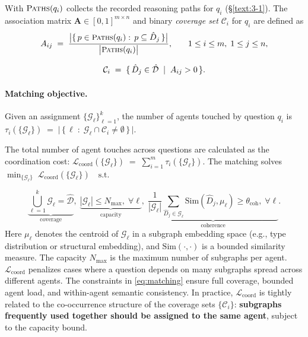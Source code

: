 \documentclass[sigconf]{acmart}
\begin{document}
With \(\textsc{Paths}(q_i)\) collects the recorded reasoning paths for \(q_i\) (\S\ref{text:3-1}). The association matrix \(\mathbf{A}\in[0,1]^{m\times n}\) and binary \emph{coverage set} \(\mathcal{C}_i\) for \(q_i\) are defined as
\begin{equation}
\small
A_{ij}
\;=\;
\frac{\bigl|\{\,p \in \textsc{Paths}(q_i):\, p \subseteq \hat{D}_j\,\}\bigr|}
{\bigl|\textsc{Paths}(q_i)\bigr|},
\qquad
1\le i\le m,\; 1\le j\le n,
\label{eq:assoc}
\end{equation}

\begin{equation}
\small
\mathcal{C}_i \;=\; \{\, \hat{D}_j \in \hat{\mathcal{D}} \; \mid \; A_{ij}>0 \,\}.
\label{eq:coverage}
\end{equation}


\paragraph{Matching objective.}
Given an assignment \(\{\mathcal{G}_\ell\}_{\ell=1}^k\), the number of agents
touched by question \(q_i\) is
$
\tau_i(\{\mathcal{G}_\ell\})
\;=\;
\bigl|\, \{\, \ell \;:\; \mathcal{G}_\ell \cap \mathcal{C}_i \neq \emptyset \,\} \,\bigr|.
$

The total number of agent touches across questions are calculated as the coordination cost:
$
\mathcal{L}_{\text{coord}}(\{\mathcal{G}_\ell\})
\;=\;
\sum_{i=1}^{m} \tau_i(\{\mathcal{G}_\ell\}).
$ The matching solves
$
\min_{\{\mathcal{G}_\ell\}}
\;\mathcal{L}_{\text{coord}}(\{\mathcal{G}_\ell\})
\quad
\text{s.t.}
$

\begin{equation}
\underbrace{\bigcup_{\ell=1}^{k}\mathcal{G}_\ell=\hat{\mathcal{D}}}_{\text{coverage}},
\;
\underbrace{|\mathcal{G}_\ell|\le N_{\max},\;\forall\ell}_{\text{capacity}},
\;
\underbrace{\frac{1}{|\mathcal{G}_\ell|}\!\sum_{\hat{D}_j\in\mathcal{G}_\ell}
\text{Sim}(\hat{D}_j,\mu_\ell)\ge \theta_{\text{coh}},\;\forall\ell}_{\text{coherence}}.
\label{eq:matching}
\end{equation}
Here \(\mu_\ell\) denotes the centroid of \(\mathcal{G}_\ell\) in a subgraph embedding
space (e.g., type distribution or structural embedding), and
\(\text{Sim}(\cdot,\cdot)\) is a bounded similarity measure.
The capacity \(N_{\max}\) is the maximum number of subgraphs per agent. \(\mathcal{L}_{\text{coord}}\) penalizes cases where a question depends on many subgraphs spread across different agents. The constraints in \eqref{eq:matching} ensure full coverage, bounded agent load,
and within-agent semantic consistency. In practice, \(\mathcal{L}_{\text{coord}}\) is tightly related to the co-occurrence structure of the coverage sets \(\{\mathcal{C}_i\}\): \textbf{subgraphs frequently used together should be assigned to the same agent}, subject to the capacity bound.
\end{document}
